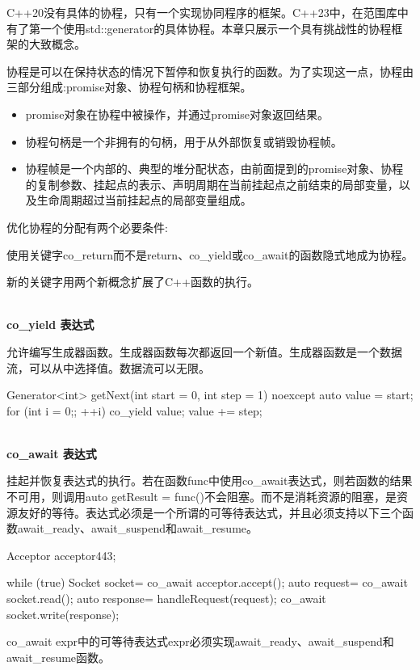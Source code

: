 
C++20没有具体的协程，只有一个实现协同程序的框架。C++23中，在范围库中有了第一个使用std::generator的具体协程。本章只展示一个具有挑战性的协程框架的大致概念。

协程是可以在保持状态的情况下暂停和恢复执行的函数。为了实现这一点，协程由三部分组成:promise对象、协程句柄和协程框架。

\begin{itemize}
\item 
promise对象在协程中被操作，并通过promise对象返回结果。

\item 
协程句柄是一个非拥有的句柄，用于从外部恢复或销毁协程帧。

\item 
协程帧是一个内部的、典型的堆分配状态，由前面提到的promise对象、协程的复制参数、挂起点的表示、声明周期在当前挂起点之前结束的局部变量，以及生命周期超过当前挂起点的局部变量组成。
\end{itemize}

优化协程的分配有两个必要条件:

使用关键字co\_return而不是return、co\_yield或co\_await的函数隐式地成为协程。

新的关键字用两个新概念扩展了C++函数的执行。

\noindent
\\\textbf{co\_yield 表达式}

允许编写生成器函数。生成器函数每次都返回一个新值。生成器函数是一个数据流，可以从中选择值。数据流可以无限。


\begin{cpp}
Generator<int> getNext(int start = 0, int step = 1) noexcept {
	auto value = start;
	for (int i = 0;; ++i){
		co_yield value;
		value += step;
	}
}
\end{cpp}

\noindent
\\\textbf{co\_await 表达式}

挂起并恢复表达式的执行。若在函数func中使用co\_await表达式，则若函数的结果不可用，则调用auto getResult = func()不会阻塞。而不是消耗资源的阻塞，是资源友好的等待。表达式必须是一个所谓的可等待表达式，并且必须支持以下三个函数await\_ready、await\_suspend和await\_resume。


\begin{cpp}
Acceptor acceptor{443};

while (true){
	Socket socket= co_await acceptor.accept();
	auto request= co_await socket.read();
	auto response= handleRequest(request);
	co_await socket.write(response);
}
\end{cpp}

co\_await expr中的可等待表达式expr必须实现await\_ready、await\_suspend和await\_resume函数。






















